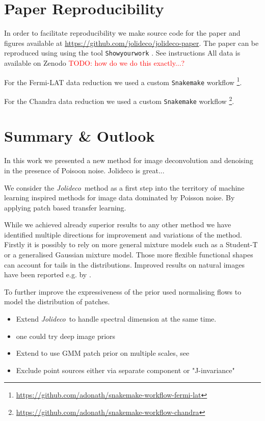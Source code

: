 \documentclass[twocolumn]{aastex631}
\newcommand{\jolideco}{\textit{Jolideco}~}
\newcommand{\todo}[1]{\textcolor{red}{TODO: #1}\PackageWarning{TODO:}{#1!}}
\begin{document}
    \section{Paper Reproducibility}
    In order to facilitate reproducibility we make source code for the paper and figures  available at \url{https://github.com/jolideco/jolideco-paper}.
    The paper can be reproduced using using the tool \texttt{Showyourwork} \citep{Luger2021}. See instructions 
    All data is available on Zenodo \todo{how do we do this exactly...?}
    
    For the Fermi-LAT data reduction we used a custom \texttt{Snakemake} workflow \footnote{\url{https://github.com/adonath/snakemake-workflow-fermi-lat}}.

    For the Chandra data reduction we used a custom \texttt{Snakemake} workflow \footnote{\url{https://github.com/adonath/snakemake-workflow-chandra}}.
        
    
    \section{Summary \& Outlook}
    In this work we presented a new method for image deconvolution and denoising in the presence of Poisoon noise.
    Jolideco is great...

    We consider the \jolideco method as a first step into the territory of machine learning inspired methods for image data 
    dominated by Poisson noise. By applying patch based transfer learning. 

    While we achieved already superior results to any other method we have identified multiple directions for improvement and variations of the method. Firstly it is possibly to rely on more general mixture models such as a Student-T or a generalised Gaussian mixture model. Those more flexible functional shapes can account for tails in the distributions. Improved results
    on natural images have been reported e.g. by \cite{}.

    To further improve the expressiveness of the prior \cite{Altekrueger2022} used normalising flows to model the distribution of patches.

    
    
    \begin{itemize}
        \item Extend \jolideco to handle spectral dimension at the same time.
        \item one could try deep image priors \citep{Ulyanov2017}
        \item Extend to use GMM patch prior on multiple scales, see \cite{Papyan2015}
        \item Exclude point sources either via separate component or "J-invariance"
    \end{itemize}
\end{document}
